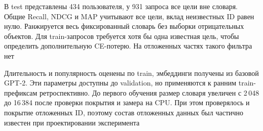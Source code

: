 В test представлены 434 пользователя, у 931 запроса все цели вне словаря.
Общие Recall, NDCG и MAP учитывают все цели, вклад неизвестных ID равен нулю.
Ранжируется весь фиксированный словарь без выборки отрицательных объектов.
Для train-запросов требуется хотя бы одна известная цель, чтобы определить
дополнительную CE-потерю. На отложенных частях такого фильтра нет

Длительность и популярность оценены по train, эмбеддинги получены
из базовой GPT-2. Эти параметры доступны до validation,
но применяются к ранним train-префиксам ретроспективно.
До первого обучения размер словаря увеличен с 2\,048 до 16\,384
после проверки покрытия и замера на CPU. При этом проверялось
и покрытие отложенных ID, поэтому состав отложенных данных
был частично известен при проектировании эксперимента
